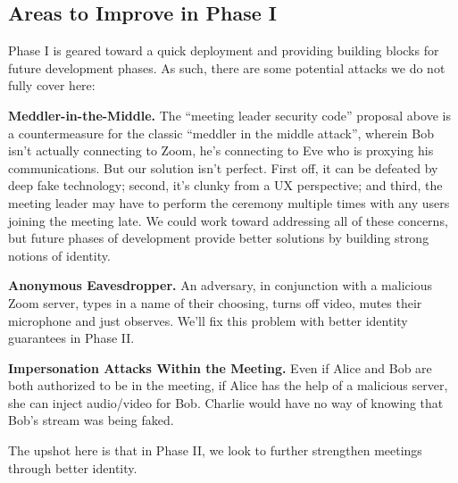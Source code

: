 \subsection{Areas to Improve in Phase I}
Phase I is geared toward a quick deployment and providing building blocks for future development phases. As such, there are some potential attacks we do not fully cover here:
\begin{description}
\item {\bf Meddler-in-the-Middle.} The ``meeting leader security code'' proposal above is a countermeasure for the classic ``meddler in the middle attack'', wherein Bob isn't actually connecting to Zoom, he's connecting to Eve who is proxying his communications. But our solution isn't perfect.  First off, it can be defeated by deep fake technology; second, it's clunky from a UX perspective; and third, the meeting leader may have to perform the ceremony multiple times with any users joining the meeting late. We could work toward addressing all of these concerns, but future phases of development provide better solutions by building strong notions of identity.
\item {\bf Anonymous Eavesdropper.} An adversary, in conjunction with a malicious Zoom server, types in a name of their choosing, turns off video, mutes their microphone and just observes. We'll fix this problem with better identity guarantees in Phase II.
\item {\bf Impersonation Attacks Within the Meeting.} Even if Alice and Bob are both authorized to be in the meeting, if Alice has the help of a malicious server, she can inject audio/video for Bob. Charlie would have no way of knowing that Bob's stream was being faked.
\end{description}

The upshot here is that in Phase II, we look to further strengthen meetings through better identity.
